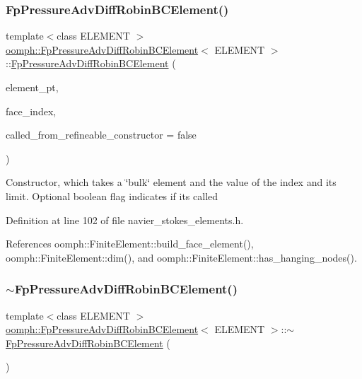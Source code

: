 \subsubsection{\texorpdfstring{Fp\+Pressure\+Adv\+Diff\+Robin\+B\+C\+Element()}{FpPressureAdvDiffRobinBCElement()}}
{\footnotesize\ttfamily template$<$class E\+L\+E\+M\+E\+NT $>$ \\
\hyperlink{classoomph_1_1FpPressureAdvDiffRobinBCElement}{oomph\+::\+Fp\+Pressure\+Adv\+Diff\+Robin\+B\+C\+Element}$<$ E\+L\+E\+M\+E\+NT $>$\+::\hyperlink{classoomph_1_1FpPressureAdvDiffRobinBCElement}{Fp\+Pressure\+Adv\+Diff\+Robin\+B\+C\+Element} (\begin{DoxyParamCaption}\item[{\hyperlink{classoomph_1_1FiniteElement}{Finite\+Element} $\ast$const \&}]{element\+\_\+pt,  }\item[{const int \&}]{face\+\_\+index,  }\item[{const bool \&}]{called\+\_\+from\+\_\+refineable\+\_\+constructor = {\ttfamily false} }\end{DoxyParamCaption})\hspace{0.3cm}{\ttfamily [inline]}}

Constructor, which takes a \char`\"{}bulk\char`\"{} element and the value of the index and its limit. Optional boolean flag indicates if it\textquotesingle{}s called 

Definition at line 102 of file navier\+\_\+stokes\+\_\+elements.\+h.



References oomph\+::\+Finite\+Element\+::build\+\_\+face\+\_\+element(), oomph\+::\+Finite\+Element\+::dim(), and oomph\+::\+Finite\+Element\+::has\+\_\+hanging\+\_\+nodes().

\mbox{\label{classoomph_1_1FpPressureAdvDiffRobinBCElement_af684bf56d91023d4adaaaec1419a3216}} 
\subsubsection{\texorpdfstring{$\sim$\+Fp\+Pressure\+Adv\+Diff\+Robin\+B\+C\+Element()}{~FpPressureAdvDiffRobinBCElement()}}
{\footnotesize\ttfamily template$<$class E\+L\+E\+M\+E\+NT $>$ \\
\hyperlink{classoomph_1_1FpPressureAdvDiffRobinBCElement}{oomph\+::\+Fp\+Pressure\+Adv\+Diff\+Robin\+B\+C\+Element}$<$ E\+L\+E\+M\+E\+NT $>$\+::$\sim$\hyperlink{classoomph_1_1FpPressureAdvDiffRobinBCElement}{Fp\+Pressure\+Adv\+Diff\+Robin\+B\+C\+Element} (\begin{DoxyParamCaption}{ }\end{DoxyParamCaption})\hspace{0.3cm}{\ttfamily [inline]}}



